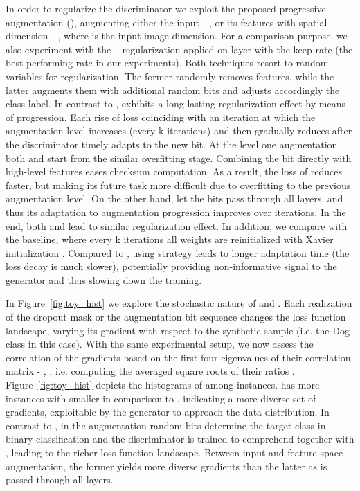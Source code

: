 \documentclass{article}
\begin{document}
\begin{center}
In order to regularize the discriminator we exploit the proposed progressive augmentation (), augmenting either the input - , or its features with spatial dimension  - , where  is the input image dimension. For a comparison purpose, we also experiment with the ~\cite{JMLR:v15:srivastava14a} regularization applied on  layer with the keep rate  (the best performing rate in our experiments). Both techniques resort to random variables for regularization. The former randomly removes features, while the latter augments them with additional random bits and adjusts accordingly the class label. 
In contrast to ,  exhibits a long lasting regularization effect by means of progression. Each rise of  loss coinciding with an iteration at which the augmentation level increases (every \unit{k} iterations) and then gradually reduces after the discriminator timely adapts to the new bit. At the level one augmentation, both  and  start from the similar overfitting stage. Combining the bit  directly with high-level features eases checksum computation. As a result, the  loss of  reduces faster, but making its future task more difficult due to overfitting to the previous augmentation level. On the other hand,   let the bits pass through all layers, and thus its adaptation to augmentation progression improves over iterations. In the end, both  and  lead to similar regularization effect. In addition, we compare  with the  baseline, where every \unit{k} iterations all weights are reinitialized with Xavier initialization \cite{GlorotAISTATS2010}. Compared to , using  strategy leads to longer adaptation time (the  loss decay is much slower), potentially providing non-informative signal to the generator and thus slowing down the training.


In Figure~\ref{fig:toy_hist} we explore the stochastic nature of  and . Each realization of the dropout mask or the augmentation bit sequence  changes the loss function landscape, varying its gradient with respect to the synthetic sample (i.e. the Dog class in this case). With the same experimental setup, we now assess the correlation of the gradients based on the first four eigenvalues of their correlation matrix - , , i.e. computing the averaged square roots of their ratios . Figure~\ref{fig:toy_hist} depicts the histograms of  among  instances.  has more instances with smaller  in comparison to , indicating a more diverse set of gradients, exploitable by the generator to approach the data distribution. In contrast to , in  the augmentation random bits determine the target class in binary classification and the discriminator is trained to comprehend  together with , leading to the richer loss function landscape. Between input and feature space augmentation, the former yields more diverse gradients than the latter as  is passed through all layers. 


\end{center}
\end{document}
